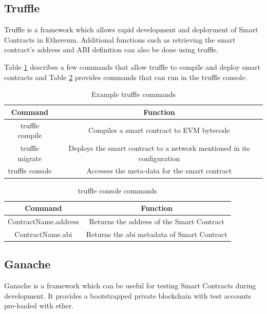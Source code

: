 \documentclass[11pt,openright]{report}
\begin{document}
\subsection{Truffle}
Truffle is a framework which allows rapid development and deployment of Smart Contracts in Ethereum. Additional functions such as retrieving the smart contract's address and ABI definition can also be done using truffle.

Table \ref{truffle_commands} describes a few commands that allow truffle to compile and deploy smart contracts and Table \ref{truffle_console} provides commands that can run in the truffle console.

\begin{table}[!htbp]
    \renewcommand{\arraystretch}{1.3}
    \caption{Example truffle commands}
    \label{truffle_commands}
    \centering
    \begin{tabular}{|c|c|}
        \hline
        \bfseries Command & \bfseries Function \\
        \hline\hline
        truffle compile & Compiles a smart contract to EVM bytecode \\ \hline
        truffle migrate & Deploys the smart contract to a network mentioned in its configuration \\ \hline
        truffle console & Accesses the meta-data for the smart contract \\ \hline
    \end{tabular}
\end{table}

\begin{table}[!htbp]
    \renewcommand{\arraystretch}{1.3}
    \caption{truffle console commands}
    \label{truffle_console}
    \centering
    \begin{tabular}{|c|c|}
        \hline
        \bfseries Command & \bfseries Function \\
        \hline\hline
        ContractName.address & Returns the address of the Smart Contract \\ \hline
        ContractName.abi & Returns the abi metadata of Smart Contract \\ \hline
    \end{tabular}
\end{table}

\subsection{Ganache}
Ganache is a framework which can be useful for testing Smart Contracts during development. It provides a bootstrapped private blockchain with test accounts pre-loaded with ether.
\end{document}
